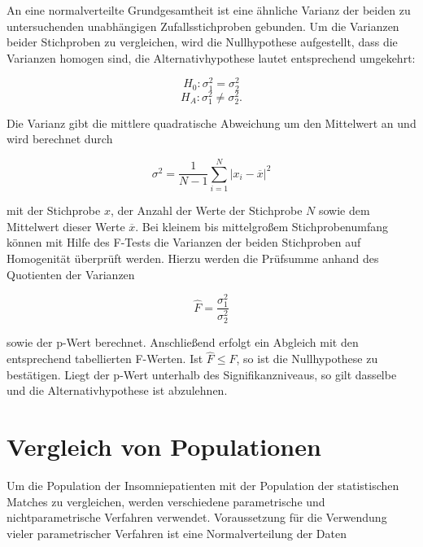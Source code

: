 An eine normalverteilte Grundgesamtheit ist eine ähnliche Varianz der beiden zu untersuchenden unabhängigen Zufallsstichproben gebunden. Um die Varianzen beider Stichproben zu vergleichen, wird die Nullhypothese aufgestellt, dass die Varianzen homogen sind, die Alternativhypothese lautet entsprechend umgekehrt:

\begin{equation}
H_0: \sigma_{1}^2 = \sigma_{2}^2\nonumber
\end{equation}
\begin{equation}
H_A: \sigma_{1}^2 \neq \sigma_{2}^2.
	\label{eq:Ho_varianz}
\end{equation}

Die Varianz gibt die mittlere quadratische Abweichung um den Mittelwert an und wird berechnet durch

\begin{equation}
\sigma^2 = \frac{1}{N-1}\sum \limits_{i=1}^N |x_i - \overline{x}|^2
\end{equation}

mit der Stichprobe $x$, der Anzahl der Werte der Stichprobe $N$ sowie dem Mittelwert dieser Werte $\overline{x}$. Bei kleinem bis mittelgroßem Stichprobenumfang können mit Hilfe des F-Tests die Varianzen der beiden Stichproben auf Homogenität überprüft werden. Hierzu werden die Prüfsumme anhand des Quotienten der Varianzen

\begin{equation}
\hat{F} = \frac{\sigma_{1}^2}{\sigma_{2}^2}
\end{equation}

sowie der p-Wert berechnet. Anschließend erfolgt ein Abgleich mit den entsprechend tabellierten F-Werten. Ist $\hat{F}\leq F$, so ist die Nullhypothese zu bestätigen. Liegt der p-Wert unterhalb des Signifikanzniveaus, so gilt dasselbe und die Alternativhypothese ist abzulehnen. \parencite{hedderich_angewandte_2016}

\section{Vergleich von Populationen}

Um die Population der Insomniepatienten mit der Population der statistischen Matches zu vergleichen, werden verschiedene parametrische und nichtparametrische Verfahren verwendet. Voraussetzung für die Verwendung vieler parametrischer Verfahren ist eine Normalverteilung der Daten



